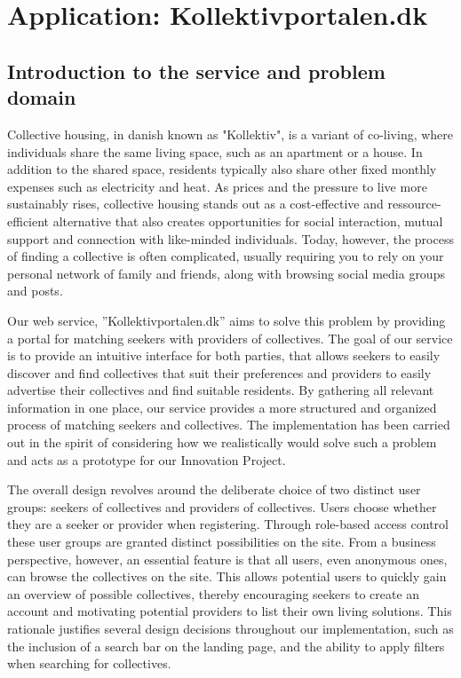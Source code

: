\section{Application: Kollektivportalen.dk}



\subsection{Introduction to the service and problem domain}
Collective housing, in danish known as "Kollektiv", is a variant of co-living, where individuals share the same living space, such as an apartment or a house. 
In addition to the shared space, residents typically also share other fixed monthly expenses such as electricity and heat.
As prices and the pressure to live more sustainably rises, collective housing stands out as a cost-effective and ressource-efficient alternative
that also creates opportunities for social interaction, mutual support and connection with like-minded individuals.
Today, however, the process of finding a collective is often complicated, usually requiring you to rely on your personal
network of family and friends, along with browsing social media groups and posts.

Our web service, ''Kollektivportalen.dk'' aims to solve this problem by providing a portal for matching seekers with providers of collectives.
The goal of our service is to provide an intuitive interface for both parties, that allows seekers to easily discover and 
find collectives that suit their preferences and providers to easily advertise their collectives and find suitable residents.
By gathering all relevant information in one place, our service provides a more structured and organized process of matching seekers and collectives.
The implementation has been carried out in the spirit of considering how we realistically would solve such a problem and acts as a prototype for our Innovation Project.


The overall design revolves around the deliberate choice of two distinct user groups: seekers of collectives and providers of collectives.
Users choose whether they are a seeker or provider when registering.
Through role-based access control these user groups are granted distinct possibilities on the site.
From a business perspective, however, an essential feature is that all users, even anonymous ones, can browse the collectives on the site.
This allows potential users to quickly gain an overview of possible collectives, 
thereby encouraging seekers to create an account and motivating potential providers to list their own living solutions. 
This rationale justifies several design decisions throughout our implementation, such as the inclusion of a search bar on the landing page, and the 
ability to apply filters when searching for collectives.



